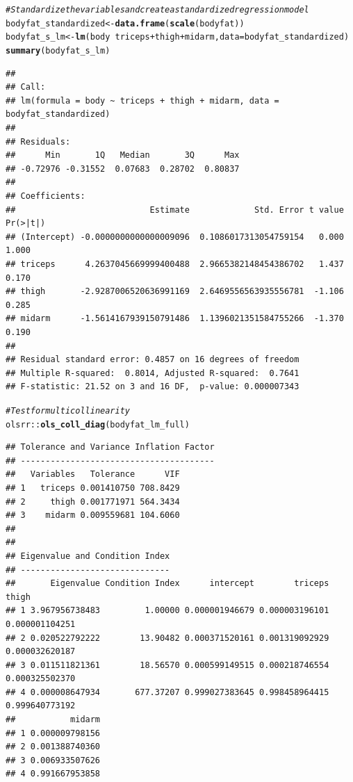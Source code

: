 \documentclass{article}\usepackage[]{graphicx}\usepackage[]{color}
\makeatletter
\newcommand{\hlcom}[1]{\textcolor[rgb]{0.678,0.584,0.686}{\textit{#1}}}%
\newcommand{\hlopt}[1]{\textcolor[rgb]{0,0,0}{#1}}%
\newcommand{\hlstd}[1]{\textcolor[rgb]{0.345,0.345,0.345}{#1}}%
\newcommand{\hlkwb}[1]{\textcolor[rgb]{0.69,0.353,0.396}{#1}}%
\newcommand{\hlkwc}[1]{\textcolor[rgb]{0.333,0.667,0.333}{#1}}%
\newcommand{\hlkwd}[1]{\textcolor[rgb]{0.737,0.353,0.396}{\textbf{#1}}}%
\newenvironment{kframe}{%
 \def\at@end@of@kframe{}%
 \ifinner\ifhmode%
  \def\at@end@of@kframe{\end{minipage}}%
  \begin{minipage}{\columnwidth}%
 \fi\fi%
 \def\FrameCommand##1{\hskip\@totalleftmargin \hskip-\fboxsep
 \colorbox{shadecolor}{##1}\hskip-\fboxsep
     \hskip-\linewidth \hskip-\@totalleftmargin \hskip\columnwidth}%
 \MakeFramed {\advance\hsize-\width
   \@totalleftmargin\z@ \linewidth\hsize
   \@setminipage}}%
 {\par\unskip\endMakeFramed%
 \at@end@of@kframe}
\newenvironment{knitrout}{}{} %
\makeatother
\begin{document}
\begin{knitrout}
\color{fgcolor}\begin{kframe}
\begin{alltt}
\hlcom{# Standardize the variables and create a standardized regression model}
\hlstd{bodyfat_standardized} \hlkwb{<-} \hlkwd{data.frame}\hlstd{(}\hlkwd{scale}\hlstd{(bodyfat))}
\hlstd{bodyfat_s_lm}\hlkwb{<-} \hlkwd{lm}\hlstd{(body} \hlopt{~} \hlstd{triceps} \hlopt{+} \hlstd{thigh} \hlopt{+} \hlstd{midarm,} \hlkwc{data} \hlstd{= bodyfat_standardized)}
\hlkwd{summary}\hlstd{(bodyfat_s_lm)}
\end{alltt}
\begin{verbatim}
## 
## Call:
## lm(formula = body ~ triceps + thigh + midarm, data = bodyfat_standardized)
## 
## Residuals:
##      Min       1Q   Median       3Q      Max 
## -0.72976 -0.31552  0.07683  0.28702  0.80837 
## 
## Coefficients:
##                           Estimate             Std. Error t value Pr(>|t|)
## (Intercept) -0.0000000000000009096  0.1086017313054759154   0.000    1.000
## triceps      4.2637045669999400488  2.9665382148454386702   1.437    0.170
## thigh       -2.9287006520636991169  2.6469556563935556781  -1.106    0.285
## midarm      -1.5614167939150791486  1.1396021351584755266  -1.370    0.190
## 
## Residual standard error: 0.4857 on 16 degrees of freedom
## Multiple R-squared:  0.8014,	Adjusted R-squared:  0.7641 
## F-statistic: 21.52 on 3 and 16 DF,  p-value: 0.000007343
\end{verbatim}
\begin{alltt}
\hlcom{# Test for multicollinearity}
\hlstd{olsrr}\hlopt{::}\hlkwd{ols_coll_diag}\hlstd{(bodyfat_lm_full)}
\end{alltt}
\begin{verbatim}
## Tolerance and Variance Inflation Factor
## ---------------------------------------
##   Variables   Tolerance      VIF
## 1   triceps 0.001410750 708.8429
## 2     thigh 0.001771971 564.3434
## 3    midarm 0.009559681 104.6060
## 
## 
## Eigenvalue and Condition Index
## ------------------------------
##       Eigenvalue Condition Index      intercept        triceps          thigh
## 1 3.967956738483         1.00000 0.000001946679 0.000003196101 0.000001104251
## 2 0.020522792222        13.90482 0.000371520161 0.001319092929 0.000032620187
## 3 0.011511821361        18.56570 0.000599149515 0.000218746554 0.000325502370
## 4 0.000008647934       677.37207 0.999027383645 0.998458964415 0.999640773192
##           midarm
## 1 0.000009798156
## 2 0.001388740360
## 3 0.006933507626
## 4 0.991667953858
\end{verbatim}
\end{kframe}
\end{knitrout}
\end{document}
